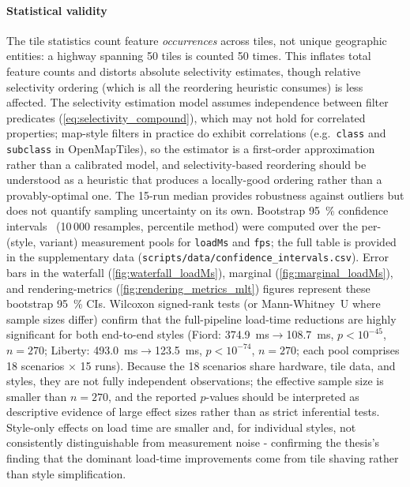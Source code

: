 \paragraph{Statistical validity}
The tile statistics count feature \emph{occurrences} across tiles, not unique geographic entities: a highway spanning 50 tiles is counted 50 times.  This inflates total feature counts and distorts absolute selectivity estimates, though relative selectivity ordering (which is all the reordering heuristic consumes) is less affected.
The selectivity estimation model assumes independence between filter predicates (\cref{eq:selectivity_compound}), which may not hold for correlated properties; map-style filters in practice do exhibit correlations (e.g.\ \texttt{class} and \texttt{subclass} in OpenMapTiles), so the estimator is a first-order approximation rather than a calibrated model, and selectivity-based reordering should be understood as a heuristic that produces a locally-good ordering rather than a provably-optimal one.
The 15-run median provides robustness against outliers but does not quantify sampling uncertainty on its own.
Bootstrap \qty{95}{\percent} confidence intervals~\cite{efronIntroductionBootstrap1993} (10\,000 resamples, percentile method) were computed over the per-(style, variant) measurement pools for \texttt{loadMs} and \texttt{fps}; the full table is provided in the supplementary data (\texttt{scripts/data/confidence\_intervals.csv}).
Error bars in the waterfall (\cref{fig:waterfall_loadMs}), marginal (\cref{fig:marginal_loadMs}), and rendering-metrics (\cref{fig:rendering_metrics_mlt}) figures represent these bootstrap \qty{95}{\percent} CIs.
Wilcoxon signed-rank tests (or Mann-Whitney~U where sample sizes differ) confirm that the full-pipeline load-time reductions are highly significant for both end-to-end styles (Fiord: \qty{374.9}{\milli\second}$\to$\qty{108.7}{\milli\second}, $p < 10^{-45}$, $n = 270$; Liberty: \qty{493.0}{\milli\second}$\to$\qty{123.5}{\milli\second}, $p < 10^{-74}$, $n = 270$; each pool comprises 18 scenarios $\times$ 15 runs).
Because the 18 scenarios share hardware, tile data, and styles, they are not fully independent observations; the effective sample size is smaller than $n = 270$, and the reported $p$-values should be interpreted as descriptive evidence of large effect sizes rather than as strict inferential tests.
Style-only effects on load time are smaller and, for individual styles, not consistently distinguishable from measurement noise - confirming the thesis's finding that the dominant load-time improvements come from tile shaving rather than style simplification.
